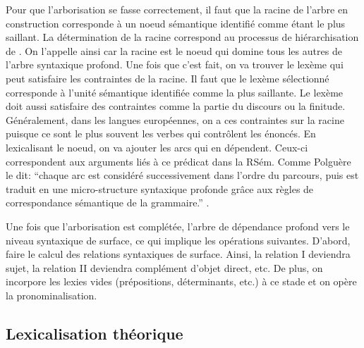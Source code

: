 Pour que l'arborisation se fasse correctement, il faut que la racine de l'arbre en construction corresponde à un noeud sémantique identifié comme étant le plus saillant. La détermination de la racine correspond au processus de hiérarchisation de \cite{PolguereStructurationmisejeu1990}. On l'appelle ainsi car la racine est le noeud qui domine tous les autres de l'arbre syntaxique profond. Une fois que c'est fait, on va trouver le lexème qui peut satisfaire les contraintes de la racine. Il faut que le lexème sélectionné corresponde à l'unité sémantique identifiée comme la plus saillante. Le lexème doit aussi satisfaire des contraintes comme la partie du discours ou la finitude. Généralement, dans les langues européennes, on a ces contraintes sur la racine puisque ce sont le plus souvent les verbes qui contrôlent les énoncés. En lexicalisant le noeud, on va  ajouter les arcs qui en dépendent. Ceux-ci correspondent aux arguments liés à ce prédicat dans la RSém. Comme Polguère le dit: ``chaque arc est considéré successivement dans l'ordre du parcours, puis est traduit en une micro-structure syntaxique profonde grâce aux règles de correspondance sémantique de la grammaire.'' \citep[p.~273]{PolguereStructurationmisejeu1990}.

Une fois que l'arborisation est complétée, l'arbre de dépendance profond  vers le niveau syntaxique de surface, ce qui implique les opérations suivantes. D'abord, faire le calcul des relations syntaxiques de surface. Ainsi, la relation I deviendra sujet, la relation II deviendra complément d'objet direct, etc. De plus, on incorpore les lexies vides (prépositions, déterminants, etc.) à ce stade et on opère la pronominalisation.


\subsection{Lexicalisation théorique}

